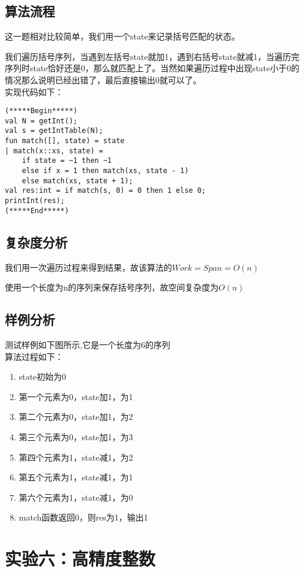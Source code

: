 \documentclass[UTF8,a4paperdui, %
]{ctexart}
\begin{document}
\subsection{算法流程}
这一题相对比较简单，我们用一个state来记录括号匹配的状态。
\par 我们遍历括号序列，当遇到左括号state就加1，遇到右括号state就减1，当遍历完序列时state恰好还是0，那么就匹配上了。当然如果遍历过程中出现state小于0的情况那么说明已经出错了，最后直接输出0就可以了。\\
实现代码如下：
\begin{lstlisting}
(*****Begin*****)
val N = getInt(); 
val s = getIntTable(N);
fun match([], state) = state
| match(x::xs, state) =
    if state = ~1 then ~1
    else if x = 1 then match(xs, state - 1) 
    else match(xs, state + 1);
val res:int = if match(s, 0) = 0 then 1 else 0;
printInt(res);
(*****End*****)
\end{lstlisting}
\subsection{复杂度分析}
我们用一次遍历过程来得到结果，故该算法的$Work=Span=O(n)$\par
使用一个长度为n的序列来保存括号序列，故空间复杂度为$O(n)$
\subsection{样例分析}
测试样例如下图所示,它是一个长度为6的序列
\\
算法过程如下：
\begin{enumerate}
    \item state初始为0
    \item 第一个元素为0，state加1，为1
    \item 第二个元素为0，state加1，为2
    \item 第三个元素为0，state加1，为3
    \item 第四个元素为1，state减1，为2
    \item 第五个元素为1，state减1，为1
    \item 第六个元素为1，state减1，为0
    \item match函数返回0，则res为1，输出1
\end{enumerate}

\newpage
\section{实验六：高精度整数}
\end{document}
